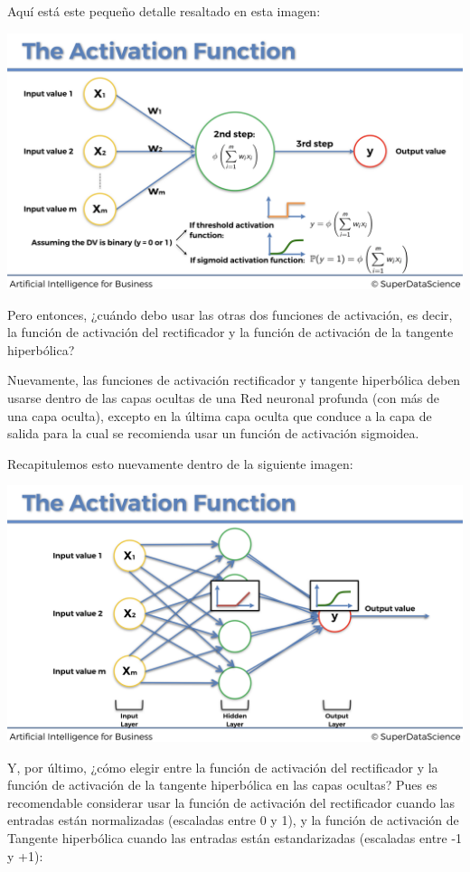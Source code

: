 \documentclass[]{book}
\begin{document}
Aquí está este pequeño detalle resaltado en esta imagen:

\includegraphics{Images/ANN_14.png}

Pero entonces, ¿cuándo debo usar las otras dos funciones de activación, es decir, la función de activación del rectificador y la función de activación de la tangente hiperbólica?

Nuevamente, las funciones de activación rectificador y tangente hiperbólica deben usarse dentro de las capas ocultas de una Red neuronal profunda (con más de una capa oculta), excepto en la última capa oculta que conduce a la capa de salida para la cual se recomienda usar un función de activación sigmoidea.

Recapitulemos esto nuevamente dentro de la siguiente imagen:

\includegraphics{Images/ANN_15.png}

Y, por último, ¿cómo elegir entre la función de activación del rectificador y la función de activación de la tangente hiperbólica en las capas ocultas? Pues es recomendable considerar usar la función de activación del rectificador cuando las entradas están normalizadas (escaladas entre 0 y 1), y la función de activación de Tangente hiperbólica cuando las entradas están estandarizadas (escaladas entre -1 y +1):
\end{document}
